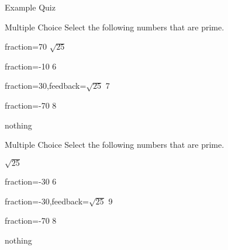 \documentclass{article}
\begin{document}
\begin{quiz}{Example Quiz}
\begin{multi}[multiple,feedback={abc\\def $\sqrt{2}$}]{Multiple Choice}
Select the following numbers that are prime.
\item[fraction=70] $\sqrt{25}$
\item[fraction=-10] 6
\item[fraction=30,feedback={$\sqrt{25}$}] 7
\item[fraction=-70] 8
\item nothing
\end{multi}

\begin{multi}[feedback={abc\\def $\sqrt{2}$}]{Multiple Choice}
Select the following numbers that are prime.
\item* $\sqrt{25}$
\item[fraction=-30] 6
\item[fraction=-30,feedback={$\sqrt{25}$}] 9
\item[fraction=-70] 8
\item nothing
\end{multi}

\end{quiz}
\end{document}
